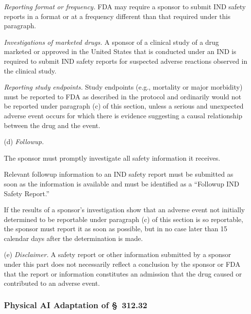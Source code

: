\begin{description}[leftmargin=0.5cm,style=sameline]
\item[(3)] \textit{Reporting format or frequency.} FDA may require a sponsor to submit IND safety reports in a format or at a frequency different than that required under this paragraph.

\item[(4)] \textit{Investigations of marketed drugs.} A sponsor of a clinical study of a drug marketed or approved in the United States that is conducted under an IND is required to submit IND safety reports for suspected adverse reactions observed in the clinical study.

\item[(5)] \textit{Reporting study endpoints.} Study endpoints (e.g., mortality or major morbidity) must be reported to FDA as described in the protocol and ordinarily would not be reported under paragraph (c) of this section, unless a serious and unexpected adverse event occurs for which there is evidence suggesting a causal relationship between the drug and the event.
\end{description}

(d) \textit{Followup.}

\begin{description}[leftmargin=0.5cm,style=sameline]
\item[(1)] The sponsor must promptly investigate all safety information it receives.
\item[(2)] Relevant followup information to an IND safety report must be submitted as soon as the information is available and must be identified as a ``Followup IND Safety Report.''
\item[(3)] If the results of a sponsor's investigation show that an adverse event not initially determined to be reportable under paragraph (c) of this section is so reportable, the sponsor must report it as soon as possible, but in no case later than 15 calendar days after the determination is made.
\end{description}

(e) \textit{Disclaimer.} A safety report or other information submitted by a sponsor under this part does not necessarily reflect a conclusion by the sponsor or FDA that the report or information constitutes an admission that the drug caused or contributed to an adverse event.

\subsubsection{Physical AI Adaptation of \S~312.32}

